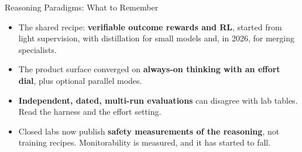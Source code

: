 \begin{frame}{Reasoning Paradigms: What to Remember}
    \begin{itemize}\itemsep0.6em
        \item The shared recipe: \textbf{verifiable outcome rewards and RL}, started from light supervision, with distillation for small models and, in 2026, for merging specialists.
        \item The product surface converged on \textbf{always-on thinking with an effort dial}, plus optional parallel modes.
        \item \textbf{Independent, dated, multi-run evaluations} can disagree with lab tables. Read the harness and the effort setting.
        \item Closed labs now publish \textbf{safety measurements of the reasoning}, not training recipes. Monitorability is measured, and it has started to fall.
    \end{itemize}
    \vspace{0.3em}
    \vspace{0.2em}
\end{frame}
